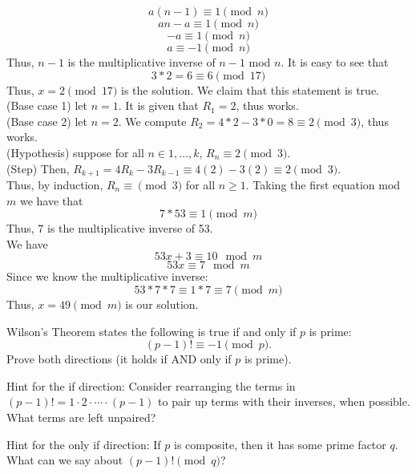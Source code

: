 \documentclass[11pt]{article}
\begin{document}
\begin{solution}\begin{Parts}
\Part 
$$a(n-1)\equiv 1\pmod{n}$$
$$an-a\equiv1\pmod{n}$$
$$-a\equiv1\pmod{n}$$
$$a\equiv-1\pmod{n}$$
Thus, $n-1$ is the multiplicative inverse of $n-1$ mod $n$.
\Part 
It is easy to see that 
$$3*2=6\equiv6\pmod{17}$$
Thus, $x=2\pmod{17}$ is the solution.
\Part 
We claim that this statement is true.
\\(Base case 1) let $n=1$. 
It is given that $R_1=2$, thus works.
\\(Base case 2) let $n=2$.
We compute $R_2=4*2-3*0=8\equiv2\pmod{3}$, thus works.
\\(Hypothesis) suppose for all $n\in1,\dots,k$, $R_n\equiv2\pmod{3}$.
\\(Step) Then, $R_{k+1}=4R_{k}-3R_{k-1}\equiv4(2)-3(2)\equiv2\pmod{3}$.
\\Thus, by induction, $R_n\equiv\pmod{3}$ for all $n\geq1$.
\Part 
Taking the first equation mod $m$ we have that
$$7*53\equiv1\pmod{m}$$
Thus, 7 is the multiplicative inverse of 53.
\\We have
$$53x+3\equiv10\mod{m}$$
$$53x\equiv7\mod{m}$$
Since we know the multiplicative inverse:
$$53*7*7\equiv1*7\equiv7\pmod{m}$$
Thus, $x=49\pmod{m}$ is our solution.
\end{Parts}\end{solution}\newpage


Wilson's Theorem states the following is true if and only if $p$ is prime:
    \[(p - 1)! \equiv -1 \pmod{p}.\]
Prove both directions (it holds if AND only if $p$ is prime).

Hint for the if direction: Consider rearranging the terms in $(p - 1)! = 1 \cdot 2 \cdot \cdots \cdot (p - 1)$ to pair up terms with their inverses, when possible. What terms are left unpaired?

Hint for the only if direction: If $p$ is composite, then it has some prime factor $q$.  What can we say about $(p-1)! \pmod{q}$?
\end{document}
